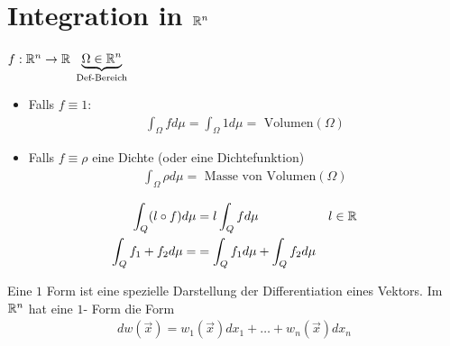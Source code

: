 \documentclass[a4paper]{article}
\begin{document}
	\section{Integration in $\mathbb{R}^n$}
		\begin{multicols}{2}
		\begin{fdef}
			$f: \mathbb{R}^n \rightarrow \mathbb{R}$ $\underbrace{\Omega \in \mathbb{R}^n}_{\text{Def-Bereich}}$
			\begin{itemize}
				\item Falls $f \equiv 1$:
					\begin{align*}
						\int_\Omega f d \mu = \int_\Omega 1 d \mu = \text{ Volumen}(\Omega)
					\end{align*}
				\item Falls $f \equiv \rho $ eine Dichte (oder eine Dichtefunktion)
					\begin{align*}
						\int_\Omega \rho d \mu = \text{ Masse von Volumen}(\Omega)
					\end{align*}
			\end{itemize}
		\end{fdef}
		\begin{fsatz}[Linearität]
			\begin{align*}
				\int_Q ( l \circ f) d \mu &= l \int_Q f d \mu &l \in \mathbb{R}\\
				\int_Q f_1 + f_2 d \mu = &= \int_Q f_1 d\mu + \int_Q f_2 d \mu
			\end{align*}
		\end{fsatz}
		\begin{fdef}[1-Formen]
			Eine $1$ Form ist eine spezielle Darstellung der Differentiation eines Vektors. Im $\mathbb{R}^n$ hat eine $1$- Form die Form
			\begin{align*}
				dw(\vec x) = w_1 (\vec x)dx_1 + \ldots + w_n (\vec x)dx_n
			\end{align*}
			
		\end{fdef}
		\end{multicols}
\end{document}
